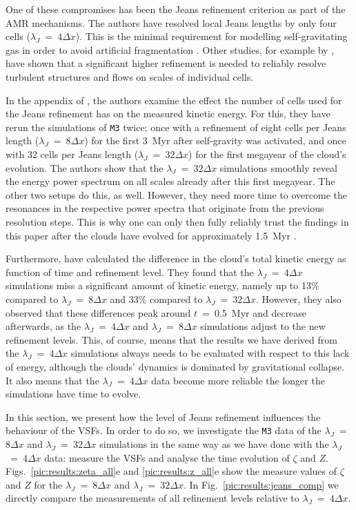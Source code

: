 One of these compromises has been the Jeans refinement criterion as part of the AMR mechanisms.
The authors have resolved local Jeans lengths by only four cells ($\lambda_J$~=~$4\Delta{}x$).
This is the minimal requirement for modelling self-gravitating gas in order to avoid artificial fragmentation \citep{Truelove1998}. 
Other studies, for example by \citet{Turk2012}, have shown that a significant higher refinement is needed to reliably resolve turbulent structures and flows on scales of individual cells.

In the appendix of , the authors examine the effect the number of cells used for the Jeans refinement has on the measured kinetic energy.
For this, they have rerun the simulations of \texttt{M3} twice; 
once with a refinement of eight cells per Jeans length ($\lambda_J$~=~$8\Delta{}x$) for the first 3~Myr after self-gravity was activated, and once with 32 cells per Jeans length ($\lambda_J$~=~$32\Delta{}x$) for the first megayear of the cloud's evolution.
The authors show that the $\lambda_J$~=~$32\Delta{}x$ simulations smoothly reveal the energy power spectrum on all scales already after this first megayear.
The other two setups do this, as well.
However, they need more time to overcome the resonances in the respective power spectra that originate from the previous resolution steps. 
This is why one can only then fully reliably trust the findings in this paper after the clouds have evolved for approximately 1.5~Myr \citep[see also][]{IbanezMejia2017,Seifried2017b}.

Furthermore,  have calculated the difference in the cloud's total kinetic energy as function of time and refinement level.
They found that the $\lambda_J$~=~$4\Delta{}x$ simulations miss a significant amount of kinetic energy, namely up to 13\% compared to $\lambda_J$~=~$8\Delta{}x$ and 33\% compared to $\lambda_J$~=~$32\Delta{}x$.
However, they also observed that these differences peak around $t$~=~0.5~Myr and decrease afterwards, as the $\lambda_J$~=~$4\Delta{}x$ and $\lambda_J$~=~$8\Delta{}x$ simulations adjust to the new refinement levels.
This, of course, means that the results we have derived from the $\lambda_J$~=~$4\Delta{}x$ simulations always needs to be evaluated with respect to this lack of energy, although the clouds' dynamics is dominated by gravitational collapse.
It also means that the $\lambda_J$~=~$4\Delta{}x$ data become more reliable the longer the simulations have time to evolve.

In this section, we present how the level of Jeans refinement influences the behaviour of the VSFs.
In order to do so, we investigate the \texttt{M3} data of the $\lambda_J$~=~$8\Delta{}x$ and $\lambda_J$~=~$32\Delta{}x$ simulations in the same way as we have done with the $\lambda_J$~=~$4\Delta{}x$ data: measure the VSFs and analyse the time evolution of $\zeta$ and $Z$.
Figs.~\ref{pic:results:zeta_all}e and \ref{pic:results:z_all}e show the measure values of $\zeta$ and $Z$ for the $\lambda_J$~=~$8\Delta{}x$ and $\lambda_J$~=~$32\Delta{}x$.
In Fig.~\ref{pic:results:jeans_comp} we directly compare the measurements of all refinement levels relative to $\lambda_J$~=~$4\Delta{}x$.

